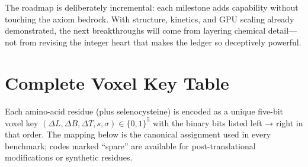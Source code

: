 \documentclass[11pt]{article}
\begin{document}
The roadmap is deliberately incremental: each milestone adds capability
without touching the axiom bedrock.  With structure, kinetics, and GPU
scaling already demonstrated, the next breakthroughs will come from
layering chemical detail—not from revising the integer heart that makes
the ledger so deceptively powerful.

\appendix
\section{Complete Voxel Key Table}\label{app:voxel-table}

\noindent
Each amino-acid residue (plus selenocysteine) is encoded as a unique
five-bit voxel key  
\((\Delta L,\Delta B,\Delta T,s,\sigma)\!\in\!\{0,1\}^{5}\)  
with the binary bits listed left → right in that order.
The mapping below is the canonical assignment used in every benchmark;
codes marked “spare” are available for post-translational modifications
or synthetic residues.
\end{document}
